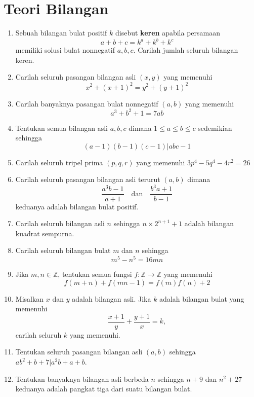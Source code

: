 \documentclass[12pt]{scrartcl}
\begin{document}
	\section{Teori Bilangan}
	\begin{enumerate}
		\item
		Sebuah bilangan bulat positif 
		$k$ disebut \textbf{keren} apabila persamaan 
		$$a+b+c=k^a+k^b+k^c$$
		memiliki solusi bulat nonnegatif $a,b,c$.
		Carilah jumlah seluruh bilangan keren.
		
		\item
		Carilah seluruh pasangan bilangan asli $(x,y)$ yang memenuhi \[ 
		x^2+(x+1)^2 = y^2+(y+1)^2
		\]
		
		\item
		Carilah banyaknya pasangan bulat nonnegatif $(a,b)$ yang memenuhi
		\[
		a^3+b^2+1=7ab
		\]
		
		\item
		Tentukan semua bilangan asli $a,b,c$ dimana  $ 1 \leq a \le b \le c$ sedemikian sehingga
		\[
		(a-1)(b-1)(c-1) | abc -1
		\]
		
		\item
		Carilah seluruh tripel prima $(p,q,r)$ yang memenuhi $3p^4-5q^4-4r^2=26$
		
		\item
		Carilah seluruh pasangan bilangan asli terurut $(a,b)$ dimana
		\[
		\dfrac{a^3b-1}{a+1} \quad \textrm{dan} \quad \dfrac{b^3a+1}{b-1}
		\]
		keduanya adalah bilangan bulat positif.
		
		\item
		Carilah seluruh bilangan asli $n$ sehingga $n \times 2^{n+1}+1$ adalah bilangan kuadrat sempurna.
		
		\item
		Carilah seluruh bilangan bulat $m$ dan $n$ sehingga 
		\[
		m^5-n^5=16mn
		\]
		
		\item
		Jika $m,n \in \mathbb{Z}$, tentukan semua fungsi $f:\mathbb{Z} \rightarrow \mathbb{Z}$ yang memenuhi 
		\[
		f(m+n)+f(mn-1)=f(m)f(n)+2
		\]
		
		\item
		Misalkan $x$ dan $y$ adalah bilangan asli. Jika $k$ adalah bilangan bulat yang memenuhi
		\[
		\dfrac{x+1}{y}+\dfrac{y+1}{x}=k,
		\]
		carilah seluruh $k$ yang memenuhi.
		
		\item
		Tentukan seluruh pasangan bilangan asli $(a,b)$ sehingga $ab^2+b+7|a^2b+a+b$.
		
		\item
		Tentukan banyaknya bilangan asli berbeda $n$ sehingga $n+9$ dan $n^2+27$ keduanya adalah pangkat tiga dari suatu bilangan bulat.
	\end{enumerate}
	
	
\end{document}
